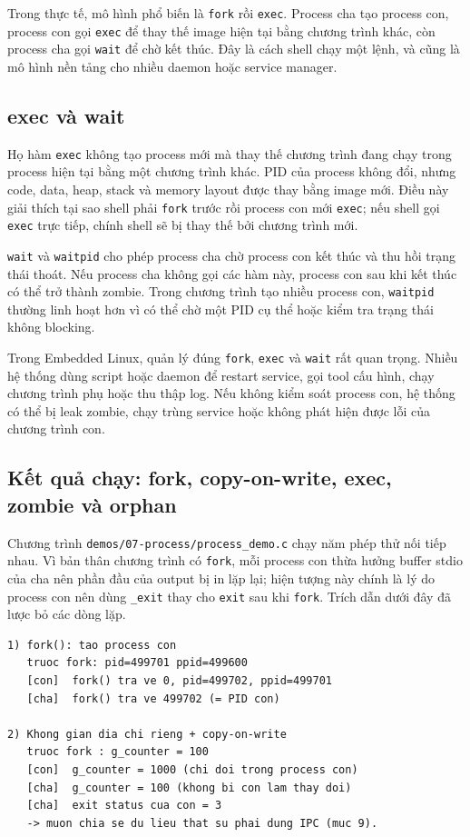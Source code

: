 \documentclass[11pt]{article}
\newcommand{\code}[1]{\texttt{#1}}
\begin{document}
Trong thực tế, mô hình phổ biến là \code{fork} rồi \code{exec}. Process cha tạo process con, process con gọi \code{exec} để thay thế image hiện tại bằng chương trình khác, còn process cha gọi \code{wait} để chờ kết thúc. Đây là cách shell chạy một lệnh, và cũng là mô hình nền tảng cho nhiều daemon hoặc service manager.

\subsection{exec và wait}

Họ hàm \code{exec} không tạo process mới mà thay thế chương trình đang chạy trong process hiện tại bằng một chương trình khác. PID của process không đổi, nhưng code, data, heap, stack và memory layout được thay bằng image mới. Điều này giải thích tại sao shell phải \code{fork} trước rồi process con mới \code{exec}; nếu shell gọi \code{exec} trực tiếp, chính shell sẽ bị thay thế bởi chương trình mới.

\code{wait} và \code{waitpid} cho phép process cha chờ process con kết thúc và thu hồi trạng thái thoát. Nếu process cha không gọi các hàm này, process con sau khi kết thúc có thể trở thành zombie. Trong chương trình tạo nhiều process con, \code{waitpid} thường linh hoạt hơn vì có thể chờ một PID cụ thể hoặc kiểm tra trạng thái không blocking.

Trong Embedded Linux, quản lý đúng \code{fork}, \code{exec} và \code{wait} rất quan trọng. Nhiều hệ thống dùng script hoặc daemon để restart service, gọi tool cấu hình, chạy chương trình phụ hoặc thu thập log. Nếu không kiểm soát process con, hệ thống có thể bị leak zombie, chạy trùng service hoặc không phát hiện được lỗi của chương trình con.

\subsection{Kết quả chạy: fork, copy-on-write, exec, zombie và orphan}

Chương trình \code{demos/07-process/process\_demo.c} chạy năm phép thử nối tiếp nhau. Vì bản thân chương trình có \code{fork}, mỗi process con thừa hưởng buffer stdio của cha nên phần đầu của output bị in lặp lại; hiện tượng này chính là lý do process con nên dùng \code{\_exit} thay cho \code{exit} sau khi \code{fork}. Trích dẫn dưới đây đã lược bỏ các dòng lặp.

\begin{lstlisting}[caption={fork, không gian địa chỉ riêng và copy-on-write}]
1) fork(): tao process con
   truoc fork: pid=499701 ppid=499600
   [con]  fork() tra ve 0, pid=499702, ppid=499701
   [cha]  fork() tra ve 499702 (= PID con)

2) Khong gian dia chi rieng + copy-on-write
   truoc fork : g_counter = 100
   [con]  g_counter = 1000 (chi doi trong process con)
   [cha]  g_counter = 100 (khong bi con lam thay doi)
   [cha]  exit status cua con = 3
   -> muon chia se du lieu that su phai dung IPC (muc 9).
\end{lstlisting}
\end{document}

